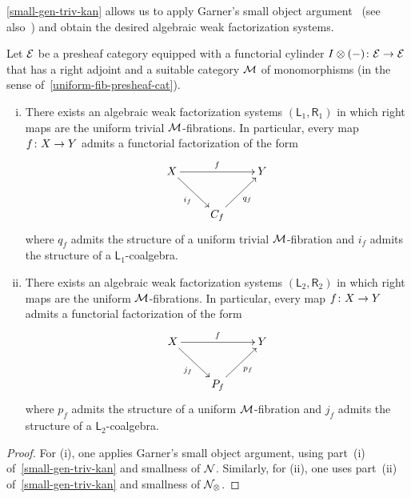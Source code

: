 \documentclass[reqno,10pt,a4paper,oneside,draft]{amsart}
\begin{document}
\cref{small-gen-triv-kan} allows us to apply Garner's small object argument~\cite[Theorem~4.4]{garner:small-object-argument} (see also~\cite[Proposition~16]{bourke-garner-I}) and obtain the desired algebraic weak factorization systems.

\begin{theorem} \label{thm:sset-cset-nwfs} Let $\catE$ be a presheaf category equipped with a functorial cylinder $I \otimes (-) \co \catE \to \catE$ that has a right adjoint and a suitable category $\cal{M}$ of monomorphisms (in the sense of~\cref{uniform-fib-presheaf-cat}).
\begin{enumerate}[(i)]
\item There exists an algebraic weak factorization systems $(\mathsf{L}_1, \mathsf{R}_1)$ in which right maps are the uniform trivial $\cal{M}$-fibrations.
In particular, every map $f \co X \to Y$ admits a functorial factorization of the form
\[
\xymatrix{
  X
  \ar[rr]^{f}
  \ar[dr]_{i_f}
&&
  Y
\\&
  C_f
  \ar[ur]_{q_f}
}
\]
where $q_f$ admits the structure of a uniform trivial $\cal{M}$-fibration and $i_f$ admits the structure of a $\mathsf{L}_1$-coalgebra.
\item There exists an algebraic weak factorization systems $(\mathsf{L}_2, \mathsf{R}_2)$ in which right maps are the uniform $\cal{M}$-fibrations.
In particular, every map $f \co X \to Y$ admits a functorial factorization of the form
\[
\xymatrix{
  X
  \ar[rr]^{f}
  \ar[dr]_{j_f}
&&
  Y
\\&
  P_f
  \ar[ur]_{p_f}
}
\]
where $p_f$ admits the structure of a uniform $\cal{M}$-fibration and $j_f$ admits the structure of a $\mathsf{L}_2$-coalgebra.
\end{enumerate}
\end{theorem}

\begin{proof} For (i), one applies Garner's small object argument, using part~(i) of~\cref{small-gen-triv-kan} and smallness of $\cal{N}$.
Similarly, for (ii), one uses part~(ii) of~\cref{small-gen-triv-kan} and smallness of $\cal{N}_\otimes$.
\end{proof}
\end{document}
